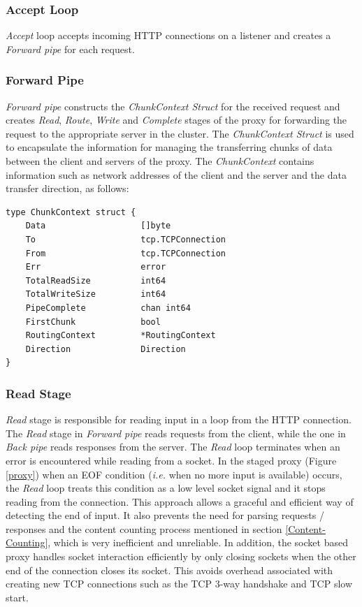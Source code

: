 \documentclass[a4paper,11pt,twoside]{report}
\begin{document}
\subsubsection*{Accept Loop} 
\textit{Accept} loop accepts incoming HTTP connections on a listener and creates a \textit{Forward pipe} for each request.

\subsubsection*{Forward Pipe} 
\textit{Forward pipe} constructs the \textit{ChunkContext Struct} for the received request and creates \textit{Read}, \textit{Route}, \textit{Write} and \textit{Complete} stages of the proxy for forwarding the request to the appropriate server in the cluster. The \textit{ChunkContext Struct} is used to encapsulate the information for managing the transferring chunks of data between the client and servers of the proxy. The \textit{ChunkContext} contains information such as network addresses of the client and the server and the data transfer direction, as follows: \bigskip  

\begin{lstlisting}[language=terminal, xleftmargin= .5in, xrightmargin= 1.75in]
type ChunkContext struct {
	Data                   []byte
	To                     tcp.TCPConnection
	From                   tcp.TCPConnection
	Err                    error
	TotalReadSize          int64
	TotalWriteSize         int64
	PipeComplete           chan int64
	FirstChunk             bool
	RoutingContext         *RoutingContext
	Direction              Direction
}
\end{lstlisting} 

\subsubsection*{Read Stage} 
\textit{Read} stage is responsible for reading input in a loop from the HTTP connection. The \textit{Read} stage in \textit{Forward pipe} reads requests from the client, while the one in \textit{Back pipe} reads responses from the server. The \textit{Read} loop terminates when an error is encountered while reading from a socket. In the staged proxy (Figure \ref{proxy}) when an EOF condition (\textit{i.e.} when no more input is available) occurs, the \textit{Read} loop treats this condition as a low level socket signal and it stops reading from the connection. This approach allows a graceful and efficient way of detecting the end of input. It also prevents the need for parsing requests / responses and the content counting process mentioned in section \ref{Content-Counting}, which is very inefficient and unreliable.  In addition, the socket based proxy handles socket interaction efficiently by only closing sockets when the other end of the connection closes its socket.  This avoids overhead associated with creating new TCP connections such as the TCP 3-way handshake and TCP slow start.
\end{document}
